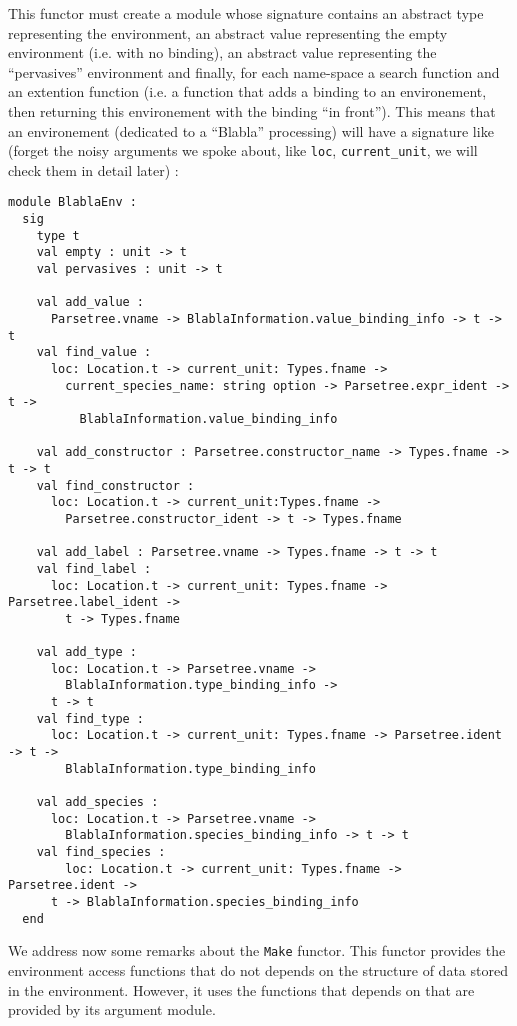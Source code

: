 \medskip
This functor must create a module whose signature contains an abstract
type representing the environment, an abstract value representing the
empty environment (i.e. with no binding), an abstract value
representing the ``pervasives'' environment and finally, for each
name-space a search function and an extention function (i.e. a
function that adds a binding to an environement, then returning this
environement with the binding ``in front''). This means that an
environement (dedicated to a ``Blabla'' processing) will have a
signature like (forget the noisy arguments we spoke about, like
{\tt loc}, {\tt current\_unit}, we will check them in detail later) :
{\scriptsize
\begin{lstlisting}[language=MyOCaml]
module BlablaEnv :
  sig
    type t
    val empty : unit -> t
    val pervasives : unit -> t

    val add_value :
      Parsetree.vname -> BlablaInformation.value_binding_info -> t -> t
    val find_value :
      loc: Location.t -> current_unit: Types.fname ->
        current_species_name: string option -> Parsetree.expr_ident -> t ->
          BlablaInformation.value_binding_info

    val add_constructor : Parsetree.constructor_name -> Types.fname -> t -> t
    val find_constructor :
      loc: Location.t -> current_unit:Types.fname ->
        Parsetree.constructor_ident -> t -> Types.fname

    val add_label : Parsetree.vname -> Types.fname -> t -> t
    val find_label :
      loc: Location.t -> current_unit: Types.fname -> Parsetree.label_ident ->
        t -> Types.fname

    val add_type :
      loc: Location.t -> Parsetree.vname ->
        BlablaInformation.type_binding_info ->
      t -> t
    val find_type :
      loc: Location.t -> current_unit: Types.fname -> Parsetree.ident -> t ->
        BlablaInformation.type_binding_info

    val add_species :
      loc: Location.t -> Parsetree.vname ->
        BlablaInformation.species_binding_info -> t -> t
    val find_species :
        loc: Location.t -> current_unit: Types.fname -> Parsetree.ident ->
      t -> BlablaInformation.species_binding_info
  end
\end{lstlisting}
}

\medskip
We address now some remarks about the {\tt Make} functor. This functor
provides the environment access functions that do not depends on the
structure of data stored in the environment. However, it uses the
functions that depends on that are provided by its argument module.

